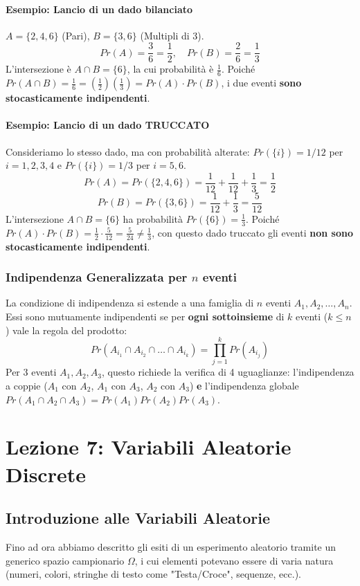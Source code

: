 \documentclass[12pt, a4paper]{article}
\begin{document}
\paragraph{Esempio: Lancio di un dado bilanciato}
$A = \{2, 4, 6\}$ (Pari), $B = \{3, 6\}$ (Multipli di 3).
$$ Pr(A) = \frac{3}{6} = \frac{1}{2}, \quad Pr(B) = \frac{2}{6} = \frac{1}{3} $$
L'intersezione è $A \cap B = \{6\}$, la cui probabilità è $\frac{1}{6}$.
Poiché $Pr(A \cap B) = \frac{1}{6} = \left(\frac{1}{2}\right) \left(\frac{1}{3}\right) = Pr(A) \cdot Pr(B)$, i due eventi \textbf{sono stocasticamente indipendenti}.

\paragraph{Esempio: Lancio di un dado TRUCCATO}
Consideriamo lo stesso dado, ma con probabilità alterate: $Pr(\{i\}) = 1/12$ per $i=1,2,3,4$ e $Pr(\{i\}) = 1/3$ per $i=5,6$.
$$ Pr(A) = Pr(\{2,4,6\}) = \frac{1}{12} + \frac{1}{12} + \frac{1}{3} = \frac{1}{2} $$
$$ Pr(B) = Pr(\{3,6\}) = \frac{1}{12} + \frac{1}{3} = \frac{5}{12} $$
L'intersezione $A \cap B = \{6\}$ ha probabilità $Pr(\{6\}) = \frac{1}{3}$.
Poiché $Pr(A) \cdot Pr(B) = \frac{1}{2} \cdot \frac{5}{12} = \frac{5}{24} \neq \frac{1}{3}$, con questo dado truccato gli eventi \textbf{non sono stocasticamente indipendenti}.

\subsubsection{Indipendenza Generalizzata per $n$ eventi}
La condizione di indipendenza si estende a una famiglia di $n$ eventi $A_1, A_2, \dots, A_n$. Essi sono mutuamente indipendenti se per \textbf{ogni sottoinsieme} di $k$ eventi ($k \le n$) vale la regola del prodotto:
$$ Pr(A_{i_1} \cap A_{i_2} \cap \dots \cap A_{i_k}) = \prod_{j=1}^k Pr(A_{i_j}) $$
Per 3 eventi $A_1, A_2, A_3$, questo richiede la verifica di 4 uguaglianze: l'indipendenza a coppie ($A_1$ con $A_2$, $A_1$ con $A_3$, $A_2$ con $A_3$) \textbf{e} l'indipendenza globale $Pr(A_1 \cap A_2 \cap A_3) = Pr(A_1)Pr(A_2)Pr(A_3)$.

\section{Lezione 7: Variabili Aleatorie Discrete}

\subsection{Introduzione alle Variabili Aleatorie}
Fino ad ora abbiamo descritto gli esiti di un esperimento aleatorio tramite un generico spazio campionario $\Omega$, i cui elementi potevano essere di varia natura (numeri, colori, stringhe di testo come "Testa/Croce", sequenze, ecc.). 
\end{document}
